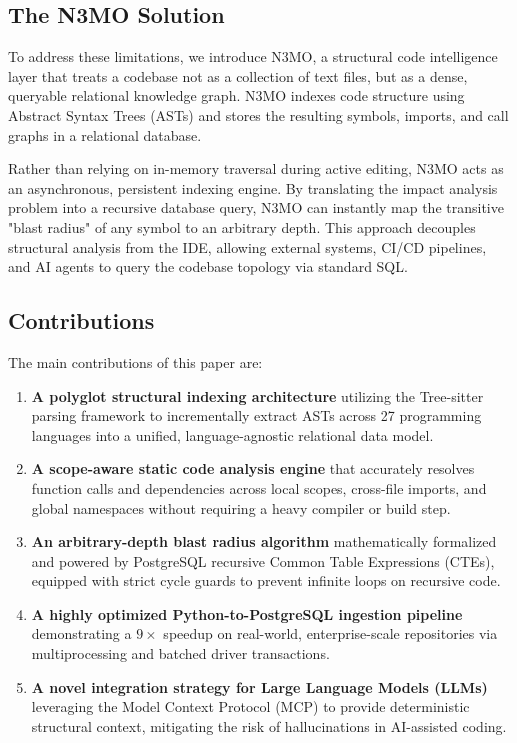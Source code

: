 \documentclass[conference]{IEEEtran}
\begin{document}
\subsection{The N3MO Solution}
To address these limitations, we introduce N3MO, a structural code intelligence layer that treats a codebase not as a collection of text files, but as a dense, queryable relational knowledge graph. N3MO indexes code structure using Abstract Syntax Trees (ASTs) and stores the resulting symbols, imports, and call graphs in a relational database. 

Rather than relying on in-memory traversal during active editing, N3MO acts as an asynchronous, persistent indexing engine. By translating the impact analysis problem into a recursive database query, N3MO can instantly map the transitive "blast radius" of any symbol to an arbitrary depth. This approach decouples structural analysis from the IDE, allowing external systems, CI/CD pipelines, and AI agents to query the codebase topology via standard SQL.

\subsection{Contributions}
The main contributions of this paper are:
\begin{enumerate}
    \item \textbf{A polyglot structural indexing architecture} utilizing the Tree-sitter parsing framework to incrementally extract ASTs across 27 programming languages into a unified, language-agnostic relational data model.
    \item \textbf{A scope-aware static code analysis engine} that accurately resolves function calls and dependencies across local scopes, cross-file imports, and global namespaces without requiring a heavy compiler or build step.
    \item \textbf{An arbitrary-depth blast radius algorithm} mathematically formalized and powered by PostgreSQL recursive Common Table Expressions (CTEs), equipped with strict cycle guards to prevent infinite loops on recursive code.
    \item \textbf{A highly optimized Python-to-PostgreSQL ingestion pipeline} demonstrating a $9\times$ speedup on real-world, enterprise-scale repositories via multiprocessing and batched driver transactions.
    \item \textbf{A novel integration strategy for Large Language Models (LLMs)} leveraging the Model Context Protocol (MCP) to provide deterministic structural context, mitigating the risk of hallucinations in AI-assisted coding.
\end{enumerate}
\end{document}
